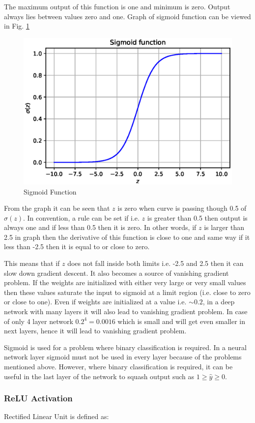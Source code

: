 \documentclass[11pt]{article}
\begin{document}
The maximum output of this function is one and minimum is zero. Output always lies between values zero and one. Graph of sigmoid function can be viewed in Fig. \ref{Sigmoid}

\begin{figure}[ht!]
	\centering
	\includegraphics[width=.6\linewidth]{files/cnn_architecture/sigmoid.eps}
	\caption{Sigmoid Function}
	\label{Sigmoid}
\end{figure}

From the graph it can be seen that $z$ is zero when curve is passing though 0.5 of $\sigma (z)$. In convention, a rule can be set if i.e. $z$ is greater than 0.5 then output is always one and if less than 0.5 then it is zero. In other words, if $z$ is larger than 2.5 in graph then the derivative of this function is close to one and same way if it less than -2.5 then it is equal to or close to zero.

This means that if $z$ does not fall inside both limits i.e. -2.5 and 2.5 then it can slow down gradient descent. It also becomes a source of vanishing gradient problem. If the weights are initialized with either very large or very small values then these values saturate the input to sigmoid at a limit region (i.e. close to zero or close to one). Even if weights are initialized at a value i.e. $\sim 0.2$, in a deep network with many layers it will also lead to vanishing gradient problem. In case of only 4 layer network $0.2^{4}=0.0016$ which is small and will get even smaller in next layers, hence it will lead to vanishing gradient problem.

Sigmoid is used for a problem where binary classification is required. In a neural network layer sigmoid must not be used in every layer because of the problems mentioned above. However, where binary classification is required, it can be useful in the last layer of the network to squash output such as $ 1 \geq \hat{y} \geq 0$.

\subsubsection{ReLU Activation}
Rectified Linear Unit is defined as:
\end{document}
